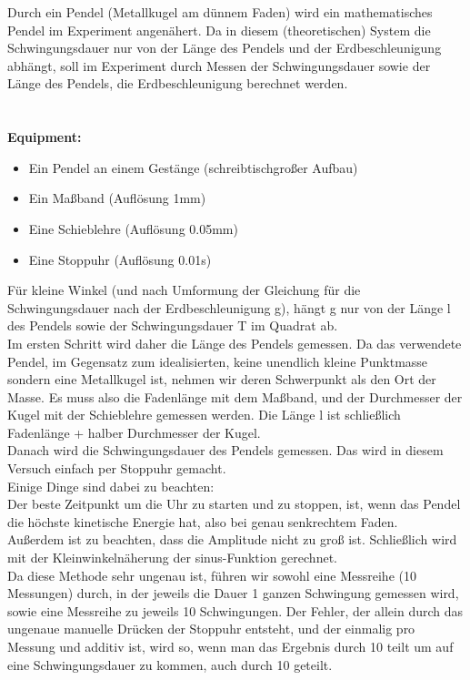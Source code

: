 \documentclass[12pt,a4paper]{article}
\begin{document}
\begin{multicols}{2}
Durch ein Pendel (Metallkugel am dünnem Faden) wird ein mathematisches Pendel im Experiment angenähert. Da in diesem (theoretischen) System die Schwingungsdauer nur von der Länge des Pendels und der Erdbeschleunigung abhängt, soll im Experiment durch Messen der Schwingungsdauer sowie der Länge des Pendels, die Erdbeschleunigung berechnet werden.\\
\\
\\
\textbf{Equipment:}\\
\begin{itemize}
	\item Ein Pendel an einem Gestänge (schreibtischgroßer Aufbau)
	\item Ein Maßband (Auflösung 1mm)
	\item Eine Schieblehre (Auflösung 0.05mm)
	\item Eine Stoppuhr (Auflösung 0.01s)
\end{itemize}
Für kleine Winkel (und nach Umformung der Gleichung für die Schwingungsdauer nach der Erdbeschleunigung g), hängt g nur von der Länge l des Pendels sowie der Schwingungsdauer T im Quadrat ab.\\
Im ersten Schritt wird daher die Länge des Pendels gemessen. Da das verwendete Pendel, im Gegensatz zum idealisierten, keine unendlich kleine Punktmasse sondern eine Metallkugel ist, nehmen wir deren Schwerpunkt als den Ort der Masse. Es muss also die Fadenlänge mit dem Maßband, und der Durchmesser der Kugel mit der Schieblehre gemessen werden. Die Länge l ist schließlich Fadenlänge + halber Durchmesser der Kugel.\\
Danach wird die Schwingungsdauer des Pendels gemessen. Das wird in diesem Versuch einfach per Stoppuhr gemacht.\\
Einige Dinge sind dabei zu beachten: \\
Der beste Zeitpunkt um die Uhr zu starten und zu stoppen, ist, wenn das Pendel die höchste kinetische Energie hat, also bei genau senkrechtem Faden.\\
Außerdem ist zu beachten, dass die Amplitude nicht zu groß ist. Schließlich wird mit der Kleinwinkelnäherung der sinus-Funktion gerechnet.\\
Da diese Methode sehr ungenau ist, führen wir sowohl eine Messreihe (10 Messungen) durch, in der jeweils die Dauer 1 ganzen Schwingung gemessen wird, sowie eine Messreihe zu jeweils 10 Schwingungen. Der Fehler, der allein durch das ungenaue manuelle Drücken der Stoppuhr entsteht, und der einmalig pro Messung und additiv ist, wird so, wenn man das Ergebnis durch 10 teilt um auf eine Schwingungsdauer zu kommen, auch durch 10 geteilt.\\

\end{multicols}
\end{document}
